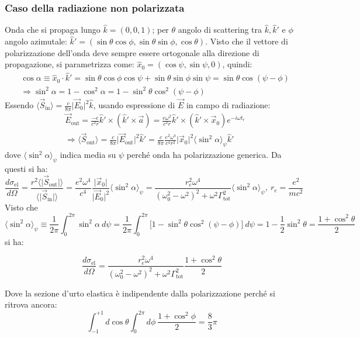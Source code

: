 \documentclass[10pt, a4paper]{scrartcl}
\numberwithin{equation}{subsection}
\theoremstyle{style1}
\newenvironment{boxenv}[1][]{
    \begin{eqbox}[#1]
    }{
   \end{eqbox}
}
\begin{document}
\subsubsection{Caso della radiazione non polarizzata}
Onda che si propaga lungo $\hat{k}=(0,0,1)$; per $\theta $ angolo di scattering tra $\hat{k}, \hat{k}'$ e $\phi $ angolo azimutale: $\hat{k}' = (\sin\theta \cos \phi , \sin\theta  \sin \phi  , \cos \theta )$. Visto che il vettore di polarizzazione dell'onda deve sempre essere ortogonale alla direzione di propagazione, si parametrizza come: $\hat{x}_0 = (\cos\psi , \sin \psi , 0 )$, quindi:
\[
	\begin{split}
		&\cos \alpha \equiv \hat{x}_0 \cdot \hat{k}' = \sin \theta  \cos \phi  \cos\psi  + \sin \theta  \sin \phi  \sin \psi  = \sin \theta \cos (\psi -\phi )\\
		&\Rightarrow \sin ^2 \alpha  =  1 - \cos ^2 \alpha  = 1 - \sin^2 \theta \cos^2 (\psi -\phi )
	\end{split}
\] 
Essendo $\langle \vec{S}_\text{in} \rangle = \frac{c}{8\pi} \lvert \vec{E}_0 \rvert^2 \hat{k} $, usando espressione di $\vec{E}$ in campo di radiazione:
\[
	\begin{split}
		&\vec{E}_\text{out} = \frac{-e}{c^2 r } \hat{k}'\times (\hat{k}' \times \vec{a}) =  \frac{e\omega^2}{c^2 r} \hat{k}'\times  (\hat{k}' \times \vec{x}_0) e^{-i\omega t_r} \\
		&\Rightarrow \langle \vec{S}_\text{out} \rangle = \frac{c}{8\pi} \lvert \vec{E}_\text{out} \rvert^2 \hat{k}' = \frac{c}{8\pi} \frac{e^2 \omega^4}{c^4 r^2} \lvert \vec{x}_0 \rvert ^2 \langle \sin^2 \alpha  \rangle_\psi \hat{k}'
	\end{split}
\] 
dove $\langle \sin^2\alpha  \rangle_\psi $ indica media su $\psi $ perch\'e onda ha polarizzazione generica. Da questi si ha:
\[
	\frac{d \sigma _\text{el}}{d \Omega } = \frac{r^2 \langle \lvert \vec{S}_\text{out} \rvert  \rangle}{\langle \lvert \vec{S}_\text{in} \rvert  \rangle} = \frac{e^2 \omega^4}{c^4} \frac{\lvert \vec{x}_0 \rvert }{\lvert \vec{E}_0 \rvert^2 } \langle \sin^2 \alpha  \rangle_\psi  = \frac{r_e^2 \omega^4 }{(\omega_0^2 - \omega^2)^2 + \omega^2 \Gamma_\text{tot}^2} \langle \sin^2 \alpha  \rangle_\psi ,\ r_e = \frac{e^2}{mc^2}
\] 
Visto che 
\[
\langle \sin^2 \alpha  \rangle_\psi  \equiv \frac{1}{2\pi} \int_{0} ^{2\pi} \sin^2 \alpha \ d \psi = \frac{1}{2\pi} \int_{0} ^{2\pi} \big[1 - \sin^2 \theta  \cos^2 (\psi -\phi )\big] \ d\psi = 1 - \frac{1}{2}\sin^2 \theta = \frac{1+ \cos^2\theta }{2}
\] 
si ha:
\begin{boxenv}[]
\begin{equation}
	\frac{d \sigma _\text{el}}{d \Omega }  = \frac{r_e^2 \omega^4}{(\omega_0^2 - \omega^2 )^2 + \omega^2 \Gamma_\text{tot}^2} \frac{1+\cos^2\theta }{2}
\end{equation}
\end{boxenv}
\noindent Dove la sezione d'urto elastica \`e indipendente dalla polarizzazione perch\'e si ritrova ancora:
\[
\int_{-1} ^{+1}  d\cos\theta  \int_{0} ^{2\pi}  d\phi \ \frac{1 + \cos^2\phi }{2} = \frac{8}{3}\pi
\] 
\end{document}
